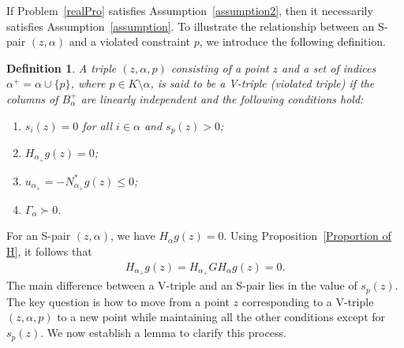 \documentclass{article}
\newtheorem{definition}{Definition}
\begin{document}
	If Problem~\eqref{realPro} satisfies Assumption~\ref{assumption2}, then it necessarily satisfies Assumption~\ref{assumption}.  
	To illustrate the relationship between an S-pair $(z, \alpha)$ and a violated constraint $p$, we introduce the following definition.
	
	\begin{definition}\label{V-triple}
		A triple $(z, \alpha, p)$ consisting of a point $z$ and a set of indices $\alpha^{+} = \alpha \cup \{ p \}$, where $p \in K \setminus \alpha$, is said to be a \emph{V-triple} (violated triple) if the columns of $B_{\alpha}^{+}$ are linearly independent and the following conditions hold:
		\begin{enumerate}
			\item $s_{i}(z) = 0$ for all $i \in \alpha$ and $s_{p}(z) > 0$;
			\item $H_{\alpha_{+}} g(z) = 0$;
			\item $u_{\alpha_{+}} = - N_{\alpha_{+}}^{\ast} g(z) \le 0$;
			\item $\Gamma_{\alpha} \succ 0$.
		\end{enumerate}
	\end{definition}
	
	For an S-pair $(z, \alpha)$, we have $H_{\alpha} g(z) = 0$.  
	Using Proposition~\ref{Proportion of H}, it follows that
	\begin{align*}
	H_{\alpha_{+}} g(z) = H_{\alpha_{+}} G H_{\alpha} g(z) = 0.
	\end{align*}
	The main difference between a V-triple and an S-pair lies in the value of $s_{p}(z)$.  
	The key question is how to move from a point $z$ corresponding to a V-triple $(z, \alpha, p)$ to a new point while maintaining all the other conditions except for $s_{p}(z)$.  
	We now establish a lemma to clarify this process.
	
\end{document}
